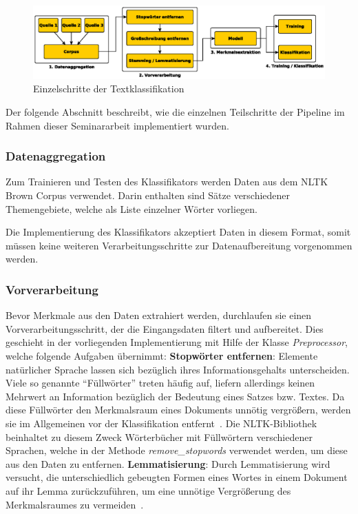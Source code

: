         \begin{figure}[htpb]
            \centering
            \includegraphics[scale=.80]{images/classification_pipeline_horizontal}
            \caption{Einzelschritte der Textklassifikation}\label{fig:pipeline}
        \end{figure}

        Der folgende Abschnitt beschreibt, wie die einzelnen Teilschritte der Pipeline im Rahmen dieser Seminararbeit implementiert wurden.

        \subsubsection{Datenaggregation}
            Zum Trainieren und Testen des Klassifikators werden Daten aus dem NLTK Brown Corpus verwendet. Darin enthalten sind Sätze verschiedener Themengebiete, welche als Liste einzelner Wörter vorliegen. 

            Die Implementierung des Klassifikators akzeptiert Daten in diesem Format, somit müssen keine weiteren Verarbeitungsschritte zur Datenaufbereitung vorgenommen werden.

        \subsubsection{Vorverarbeitung}
            Bevor Merkmale aus den Daten extrahiert werden, durchlaufen sie einen Vorverarbeitungsschritt, der die Eingangsdaten filtert und aufbereitet. 
            Dies geschieht in der vorliegenden Implementierung mit Hilfe der Klasse \textit{Preprocessor}, welche folgende Aufgaben übernimmt:\newline\newline
            \textbf{Stopwörter entfernen}:\newline
            Elemente natürlicher Sprache lassen sich bezüglich ihres Informationsgehalts unterscheiden. 
            Viele so genannte ``Füllwörter'' treten häufig auf, liefern allerdings keinen Mehrwert an Information bezüglich der Bedeutung eines Satzes bzw. Textes. 
            Da diese Füllwörter den Merkmalsraum eines Dokuments unnötig vergrößern, werden sie im Allgemeinen vor der Klassifikation entfernt~\cite{nltk}. 
            Die NLTK-Bibliothek beinhaltet zu diesem Zweck Wörterbücher mit Füllwörtern verschiedener Sprachen, welche in der Methode \textit{remove\_stopwords} verwendet werden, um diese aus den Daten zu entfernen.\newline\newline
            \textbf{Lemmatisierung}:\newline
            Durch Lemmatisierung wird versucht, die unterschiedlich gebeugten Formen eines Wortes in einem Dokument auf ihr Lemma zurückzuführen, um eine unnötige Vergrößerung des Merkmalsraumes zu vermeiden~\cite{IIR}.

